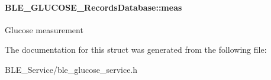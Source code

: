 \paragraph[{\texorpdfstring{meas}{meas}}]{ B\+L\+E\+\_\+\+G\+L\+U\+C\+O\+S\+E\+\_\+\+Records\+Database\+::meas}\hypertarget{struct_b_l_e___g_l_u_c_o_s_e___records_database_a758df8552b95a4b6bd49b6b77fd66054}{}\label{struct_b_l_e___g_l_u_c_o_s_e___records_database_a758df8552b95a4b6bd49b6b77fd66054}
Glucose measurement 

The documentation for this struct was generated from the following file\+:\begin{DoxyCompactItemize}
\item 
B\+L\+E\+\_\+\+Service/ble\+\_\+glucose\+\_\+service.\+h\end{DoxyCompactItemize}
